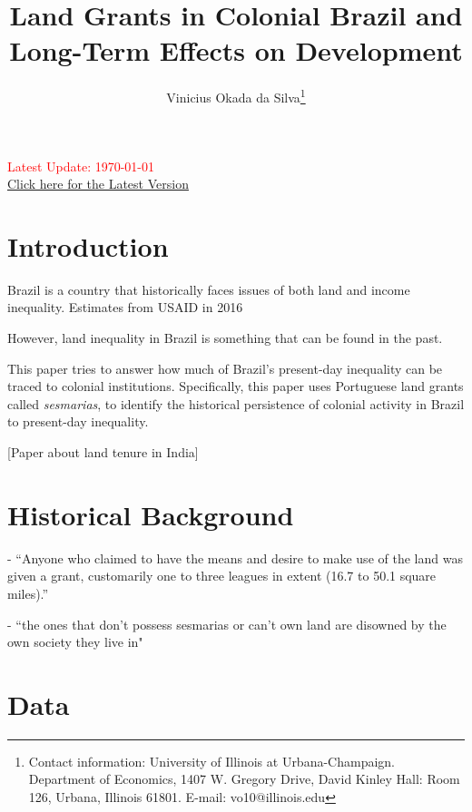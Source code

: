 \documentclass{article}
\title{Land Grants in Colonial Brazil and Long-Term Effects on Development}
\author{Vinicius Okada da Silva\thanks{Contact information: University of Illinois at Urbana-Champaign. Department of Economics, 1407 W. Gregory Drive, David Kinley Hall: Room 126, Urbana, Illinois 61801. E-mail: vo10@illinois.edu}}
\affil{Department of Economics, University of Illinois at Urbana-Champaign}
\date{}
\begin{document}
\maketitle
\thispagestyle{empty} 

\vspace{-.1cm}
\begin{center}
  \textcolor{red}{Latest Update: \today}
  \\
  \href{https://viniokadasilva.github.io/Papers/Sesmarias/02.Draft/02.Second_Draft/Sesmarias_Paper.pdf}{Click here for the Latest Version}
\end{center}
\vspace{.1cm}

\clearpage
{} 

\section{Introduction}

Brazil is a country that historically faces issues of both land and income inequality. Estimates from USAID in 2016

However, land inequality in Brazil is something that can be found in the past.

This paper tries to answer how much of Brazil's present-day inequality can be traced to colonial institutions. Specifically, this paper uses Portuguese land grants called \textit{sesmarias}, to identify the historical persistence of colonial activity in Brazil to present-day inequality.

\parencite{Dell2010-qt}
\parencite{Sokoloff2000-mb}



\textcite{Ratnoo2023-vw} [Paper about land tenure in India]


\section{Historical Background}

\textcite{Dean1971-iq} - ``Anyone who claimed to have the means and desire to make use of the land was given a grant, customarily one to three leagues in extent (16.7 to 50.1 square miles).''

\textcite{Simonsen2005-ps} - ``the ones that don't possess sesmarias or can't own land are disowned by the own society they live in"

\section{Data}
\end{document}
